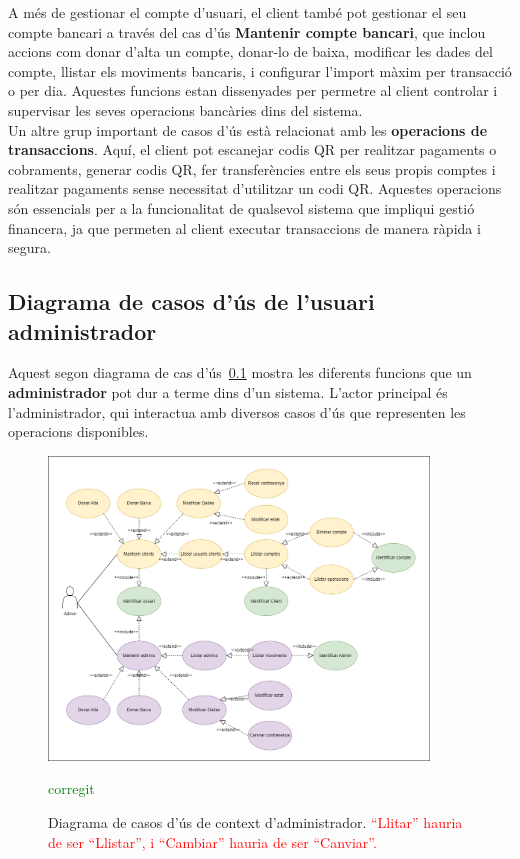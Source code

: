 \documentclass[a4paper,12pt,twoside]{ThesisStyle}
\newcommand{\pau}[1]{\textcolor{red}{#1}}
\newcommand{\sudan}[1]{\textcolor{green}{#1}}
\begin{document}
A més de gestionar el compte d'usuari, el client també pot gestionar el seu compte bancari a través del cas d'ús \textbf{Mantenir compte bancari}, que inclou accions com donar d'alta un compte, donar-lo de baixa, modificar les dades del compte, llistar els moviments bancaris, i configurar l'import màxim per transacció o per dia. Aquestes funcions estan dissenyades per permetre al client controlar i supervisar les seves operacions bancàries dins del sistema.\\

Un altre grup important de casos d'ús està relacionat amb les \textbf{operacions de transaccions}. Aquí, el client pot escanejar codis QR per realitzar pagaments o cobraments, generar codis QR, fer transferències entre els seus propis comptes i realitzar pagaments sense necessitat d'utilitzar un codi QR. Aquestes operacions són essencials per a la funcionalitat de qualsevol sistema que impliqui gestió financera, ja que permeten al client executar transaccions de manera ràpida i segura.\\



\subsection{Diagrama de casos d'ús de l'usuari administrador}
\label{subsec: Diagrama de casos d'ús de l'usuari administrador}

Aquest segon diagrama de cas d'ús~\ref{subsec: Diagrama de casos d'ús de l'usuari administrador} mostra les diferents funcions que un \textbf{administrador} pot dur a terme dins d'un sistema. L'actor principal és l'administrador, qui interactua amb diversos casos d'ús que representen les operacions disponibles.

\clearpage
\begin{figure}[h]
    \centering
    \includegraphics[width=0.9\textwidth]{imatges/diagrama caso de uso admin.png}
    \caption{Diagrama de casos d'ús de context d'administrador. \pau{``Llitar'' hauria de ser ``Llistar'', i ``Cambiar'' hauria de ser ``Canviar''.}}\sudan{corregit}
    \label{fig:Diagrama de Casos d'Ús de Context d'Administrador}
\end{figure}
\end{document}
